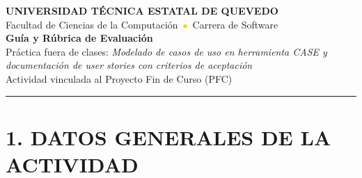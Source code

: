 \documentclass[11pt]{article}
\begin{document}
\begin{center}
{\large\textbf{\textcolor{utegreendk}{UNIVERSIDAD TÉCNICA ESTATAL DE QUEVEDO}}}\\[2pt]
{\small Facultad de Ciencias de la Computación \,\textcolor{gold}{$\bullet$}\, Carrera de Software}\\[8pt]
{\LARGE\textbf{\textcolor{utegreendk}{Guía y Rúbrica de Evaluación}}}\\[4pt]
{\large Práctica fuera de clases: \textit{Modelado de casos de uso en herramienta CASE y documentación de user stories con criterios de aceptación}}\\[2pt]
{\small Actividad vinculada al Proyecto Fin de Curso (PFC)}
\end{center}

\vspace{4pt}
\noindent\textcolor{gold}{\rule{\linewidth}{1.5pt}}

\section*{\textcolor{utegreendk}{1. DATOS GENERALES DE LA ACTIVIDAD}}
\end{document}
